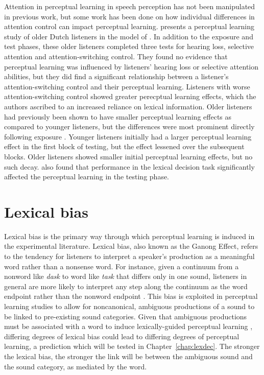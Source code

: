 Attention in perceptual learning in speech perception has not been manipulated in previous work, but some work has been done on how individual differences in attention control can impact perceptual learning.
\citet{Scharenborg2014} presents a perceptual learning study of older Dutch listeners in the model of \citet{Norris2003}.  
In addition to the exposure and test phases, these older listeners completed three tests for hearing loss, selective attention and attention-switching control.  
They found no evidence that perceptual learning was influenced by listeners' hearing loss or selective attention abilities, but they did find a significant relationship between a listener's attention-switching control and their perceptual learning.  
Listeners with worse attention-switching control showed greater perecptual learning effects, which the authors ascribed to an increased reliance on lexical information.  
Older listeners had previously been shown to have smaller perceptual learning effects as compared to younger listeners, but the differences were most prominent directly following exposure \citep{Scharenborg2013}.  
Younger listeners initially had a larger perceptual learning effect in the first block of testing, but the effect lessened over the subsequent blocks.  
Older listeners showed smaller initial perceptual learning effects, but no such decay.  
\citet{Scharenborg2013} also found that performance in the lexical decision task significantly affected the perceptual learning in the testing phase.

\section{Lexical bias}
\label{sec:lexicalbias}

Lexical bias is the primary way through which perceptual learning is induced in the experimental literature.
Lexical bias, also known as the Ganong Effect, refers to the tendency for listeners to interpret a speaker's production as a meaningful word rather than a nonsense word.  
For instance, given a continuum from a nonword like \emph{dask} to word like \emph{task} that differs only in one sound, listeners in general are more likely to interpret any step along the continuum as the word endpoint rather than the nonword endpoint \citep{Ganong1980}. 
This bias is exploited in perceptual learning studies to allow for noncanonical, ambiguous productions of a sound to be linked to pre-existing sound categories.
Given that ambiguous productions must be associated with a word to induce lexically-guided perceptual learning \citep{Norris2003}, differing degrees of lexical bias could lead to differing degrees of perceptual learning, a prediction which will be tested in Chapter~\ref{chap:lexdec}.  
The stronger the lexical bias, the stronger the link will be between the ambiguous sound and the sound category, as mediated by the word.

